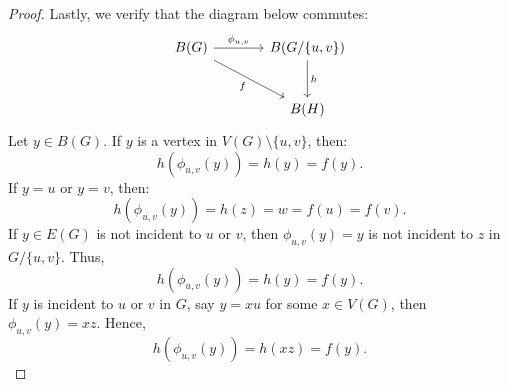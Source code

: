 \documentclass{amsart}
\theoremstyle{definition}
\theoremstyle{remark}
\numberwithin{equation}{section}
\begin{document}
\begin{proof}
		Lastly, we verify that the diagram below commutes:
		\[
		\begin{tikzcd}[column sep=large, row sep=large]
			B(G) \arrow[r, "\phi_{u,v}"] \arrow[rd, "f"'] & B(G/\{u,v\}) \arrow[d, "h"] \\
			& B(H)
		\end{tikzcd}
		\]
		Let \(y \in B(G)\). If \(y\) is a vertex in \(V(G) \setminus \{u,v\}\), then:
		\[
		h(\phi_{u,v}(y)) = h(y) = f(y).
		\]
		If \(y = u\) or \(y = v\), then:
		\[
		h(\phi_{u,v}(y)) = h(z) = w = f(u) = f(v).
		\]
		If \(y \in E(G)\) is not incident to \(u\) or \(v\), then \(\phi_{u,v}(y) = y\) is not incident to \(z\) in \(G/\{u,v\}\). Thus,
		\[
		h(\phi_{u,v}(y)) = h(y) = f(y).
		\]
		If \(y\) is incident to \(u\) or \(v\) in \(G\), say \(y=xu\) for some \(x \in V(G)\), then \(\phi_{u,v}(y) = xz\). Hence,
		\[h(\phi_{u,v}(y)) = h(xz) = f(y).\]
	\end{proof}
	
	
\end{document}

